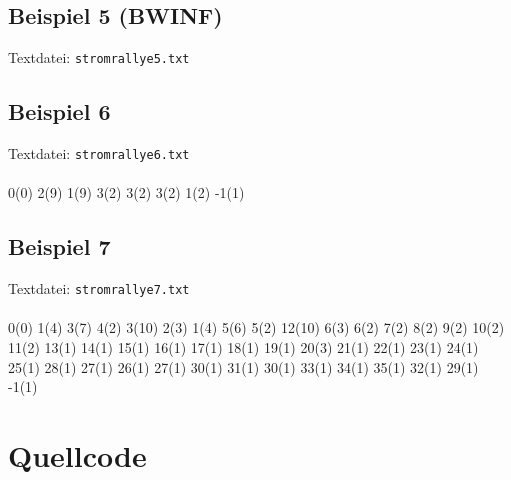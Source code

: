 \documentclass[a4paper,10pt,ngerman]{scrartcl}
\begin{document}
\subsection{Beispiel 5 (BWINF)}
Textdatei: \texttt{stromrallye5.txt}\\


\subsection{Beispiel 6}
Textdatei: \texttt{stromrallye6.txt}\\

\\

0(0) 2(9) 1(9) 3(2) 3(2) 3(2) 1(2) -1(1)

\subsection{Beispiel 7}
Textdatei: \texttt{stromrallye7.txt}\\

\\

0(0) 1(4) 3(7) 4(2) 3(10) 2(3) 1(4) 5(6) 5(2) 12(10) 6(3) 6(2) 7(2) 8(2) 9(2) 10(2) 11(2) 13(1) 14(1) 15(1) 16(1) 17(1) 18(1) 19(1) 20(3) 21(1) 22(1) 23(1) 24(1) 25(1) 28(1) 27(1) 26(1) 27(1) 30(1) 31(1) 30(1) 33(1) 34(1) 35(1) 32(1) 29(1) -1(1)


\newpage
\section{Quellcode}

\end{document}
